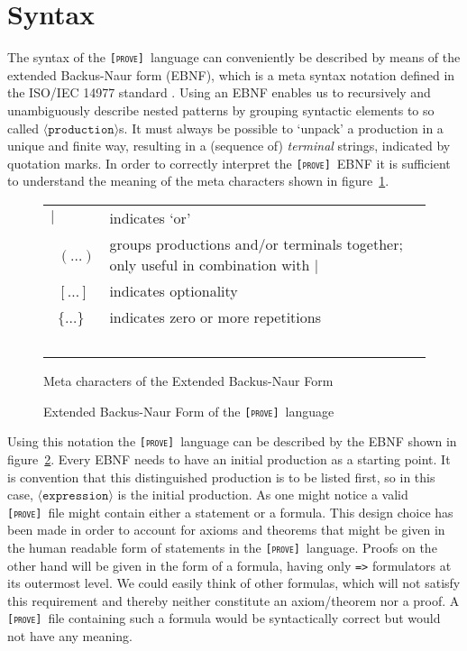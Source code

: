 \documentclass[british]{article}
\newcommand\prv{bc}
\newcommand\m[1]{\texttt{#1}}
\newcommand\name{\texttt{\textsc{[prove]}}}
\providecommand{\tabularnewline}{\\}
\begin{document}
\pagebreak{}

\section{Syntax}

The syntax of the \name\ language can conveniently be described by means of the
extended Backus-Naur form (EBNF), which is a meta syntax notation defined in the
ISO/IEC 14977 standard \parencite{ISO}. Using an EBNF enables us to recursively
and unambiguously describe nested patterns by grouping syntactic elements to so
called $\langle\texttt{production}\rangle$s.  It must always be possible to
`unpack' a production in a unique and finite way, resulting in a (sequence of)
\textit{terminal} strings, indicated by quotation marks. In order to correctly
interpret the \name\ EBNF it is sufficient to understand the meaning of the meta
characters shown in figure~\ref{fig:meta}.

\medskip{}

\begin{figure}[!ht]
\centering
\begin{doublespace}
\begin{tabular}{l|l}
$|$ & indicates `or'\tabularnewline\
$(\dots)$ & groups productions and/or terminals together; only useful in
combination with $|$\tabularnewline\
$[\dots]$ & indicates optionality\tabularnewline\
$\{\dots\}$ & indicates zero or more repetitions\tabularnewline\
\end{tabular}%
\caption{Meta characters of the Extended Backus-Naur Form}\label{fig:meta}
\end{doublespace}
\end{figure}

\begin{figure}[!ht]
\centering
\textcolor{dartmouthgreen}{}
\caption{Extended Backus-Naur Form of the \name\ language}\label{fig:ebnf}
\end{figure}

Using this notation the \name\ language can be described by the EBNF shown in
figure~\ref{fig:ebnf}.  Every EBNF needs to have an initial production as a
starting point.  It is convention that this distinguished production is to be
listed first, so in this case, $\langle\texttt{expression}\rangle$ is the initial
production. As one might notice a valid \name\ file might contain either a
statement or a formula. This design choice has been made in order to account for
axioms and theorems that might be given in the human readable form of statements
in the \name\ language.  Proofs on the other hand will be given in the form of a
formula, having only \m{=>} formulators at its outermost level. We could easily
think of other formulas, which will not satisfy this requirement and thereby
neither constitute an axiom/theorem nor a proof. A \name\ file containing such a
formula would be syntactically correct but would not have any meaning.
\end{document}
